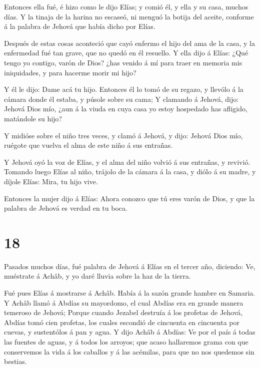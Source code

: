  Entonces ella fué, é hizo como le dijo Elías; y comió él,
y ella y su casa, muchos días.  Y la tinaja de la harina no
escaseó, ni menguó la botija del aceite, conforme á la palabra de Jehová
que había dicho por Elías.

 Después de estas cosas aconteció que cayó enfermo el hijo
del ama de la casa, y la enfermedad fué tan grave, que no quedó en él
resuello.  Y ella dijo á Elías: ¿Qué tengo yo contigo,
varón de Dios? ¿has venido á mí para traer en memoria mis iniquidades, y
para hacerme morir mi hijo?

 Y él le dijo: Dame acá tu hijo. Entonces él lo tomó de su
regazo, y llevólo á la cámara donde él estaba, y púsole sobre su cama;
 Y clamando á Jehová, dijo: Jehová Dios mío, ¿aun á la
viuda en cuya casa yo estoy hospedado has afligido, matándole su hijo?

 Y midióse sobre el niño tres veces, y clamó á Jehová, y
dijo: Jehová Dios mío, ruégote que vuelva el alma de este niño á sus
entrañas.

 Y Jehová oyó la voz de Elías, y el alma del niño volvió á
sus entrañas, y revivió.  Tomando luego Elías al niño,
trájolo de la cámara á la casa, y diólo á su madre, y díjole Elías:
Mira, tu hijo vive.

 Entonces la mujer dijo á Elías: Ahora conozco que tú eres
varón de Dios, y que la palabra de Jehová es verdad en tu boca.

\hypertarget{section-17}{%
\section{18}\label{section-17}}

 Pasados muchos días, fué palabra de Jehová á Elías en el
tercer año, diciendo: Ve, muéstrate á Achâb, y yo daré lluvia sobre la
haz de la tierra.

 Fué pues Elías á mostrarse á Achâb. Había á la sazón grande
hambre en Samaria.  Y Achâb llamó á Abdías su mayordomo, el
cual Abdías era en grande manera temeroso de Jehová;  Porque
cuando Jezabel destruía á los profetas de Jehová, Abdías tomó cien
profetas, los cuales escondió de cincuenta en cincuenta por cuevas, y
sustentólos á pan y agua.  Y dijo Achâb á Abdías: Ve por el
país á todas las fuentes de aguas, y á todos los arroyos; que acaso
hallaremos grama con que conservemos la vida á los caballos y á las
acémilas, para que no nos quedemos sin bestias.

